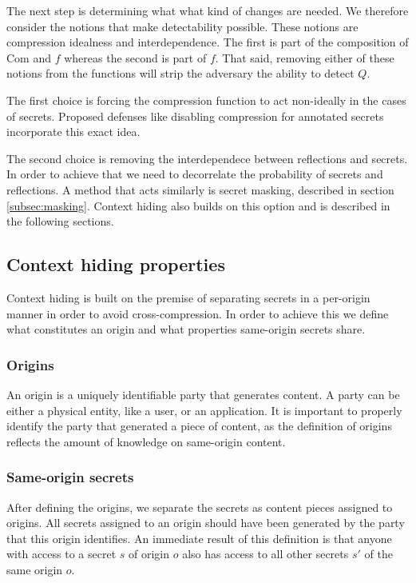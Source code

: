The next step is determining what what kind of changes are needed. We therefore
consider the notions that make detectability possible. These notions are
compression idealness and interdependence. The first is part of the composition
of $\textrm{Com}$ and $f$ whereas the second is part of $f$. That said, removing
either of these notions from the functions will strip the adversary the ability
to detect $Q$.

The first choice is forcing the compression function to act non-ideally in the
cases of secrets. Proposed defenses like disabling compression for annotated
secrets incorporate this exact idea.

The second choice is removing the interdependece between reflections and
secrets. In order to achieve that we need to decorrelate the probability of
secrets and reflections. A method that acts similarly is secret masking,
described in section \ref{subsec:masking}. Context hiding also builds on this
option and is described in the following sections.

\subsection{Context hiding properties}

Context hiding is built on the premise of separating secrets in a per-origin
manner in order to avoid cross-compression. In order to achieve this we define
what constitutes an origin and what properties same-origin secrets share.

\subsubsection{Origins}
An origin is a uniquely identifiable party that generates content. A party can
be either a physical entity, like a user, or an application. It is important to
properly identify the party that generated a piece of content, as the definition
of origins reflects the amount of knowledge on same-origin content.

\subsubsection{Same-origin secrets}
After defining the origins, we separate the secrets as content pieces assigned
to origins. All secrets assigned to an origin should have been generated by the
party that this origin identifies. An immediate result of this definition is
that anyone with access to a secret $s$ of origin $o$ also has access to all
other secrets $s'$ of the same origin $o$.

